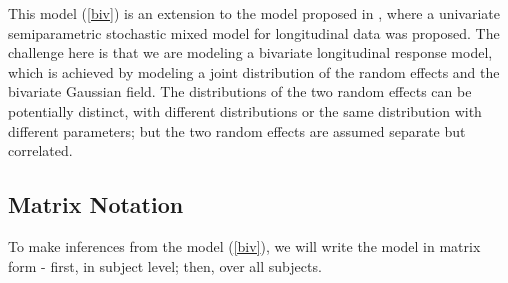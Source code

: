\documentclass[review]{elsarticle}
\begin{document}
This model (\ref{biv}) is an extension to the model proposed in \citet {Zhang:1998}, where a univariate semiparametric stochastic mixed model for longitudinal data was proposed. The challenge here is that we are modeling a bivariate longitudinal response model, which  is achieved  by modeling a joint distribution of the random effects and the bivariate Gaussian field. The distributions of the two random effects can be potentially distinct, with different distributions or the same distribution with different parameters; but the two random effects are  assumed separate but correlated. 

\subsection{Matrix Notation} \label{MatrixNotation}

To make inferences from the model (\ref{biv}), we will  write the model in matrix form -  first, in subject level; then, over all subjects.  
\end{document}
